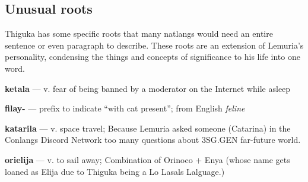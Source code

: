 \subsection{Unusual roots}
Thiguka has some specific roots that many natlangs would need an entire sentence or even paragraph to describe.
These roots are an extension of Lemuria's personality, condensing the things and concepts of significance to his life into one word.



\textbf{ketala} --- v. fear of being banned by a moderator on the Internet while asleep

\textbf{filay-} --- prefix to indicate ``with cat present''; from English \textit{feline}

\textbf{katarila} --- v. space travel; Because Lemuria asked someone (Catarina) in the Conlangs Discord Network too many questions about 3SG.GEN far-future world.

\textbf{orielija} --- v. to sail away; Combination of Orinoco + Enya (whose name gets loaned as Elija due to Thiguka being a Lo Lasals Lalguage.)
